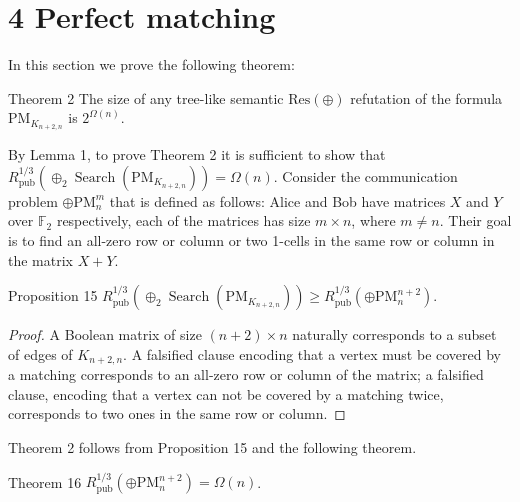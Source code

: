 \section*{4 Perfect matching}
In this section we prove the following theorem:
\begin{authorclaim}{Theorem 2}
The size of any tree-like semantic $\mathrm{Res}(\oplus)$ refutation of the formula $\mathrm{PM}_{K_{n+2,n}}$ is $2^{\Omega(n)}$.
\end{authorclaim}
By Lemma 1, to prove Theorem 2 it is sufficient to show that $R^{1/3}_{\mathrm{pub}}(\oplus_2\operatorname{Search}(\mathrm{PM}_{K_{n+2,n}}))=\Omega(n)$.
Consider the communication problem $\oplus\mathrm{PM}_n^m$ that is defined as follows: Alice and Bob have matrices $X$ and $Y$ over $\mathbb F_2$ respectively, each of the matrices has size $m\times n$, where $m\ne n$. Their goal is to find an all-zero row or column or two 1-cells in the same row or column in the matrix $X+Y$.
\begin{authorclaim}{Proposition 15}
$R^{1/3}_{\mathrm{pub}}(\oplus_2\operatorname{Search}(\mathrm{PM}_{K_{n+2,n}}))\ge R^{1/3}_{\mathrm{pub}}(\oplus\mathrm{PM}_n^{n+2})$.
\end{authorclaim}
\begin{proof}
A Boolean matrix of size $(n+2)\times n$ naturally corresponds to a subset of edges of $K_{n+2,n}$. A falsified clause encoding that a vertex must be covered by a matching corresponds to an all-zero row or column of the matrix; a falsified clause, encoding that a vertex can not be covered by a matching twice, corresponds to two ones in the same row or column.
\end{proof}
Theorem 2 follows from Proposition 15 and the following theorem.
\begin{authorclaim}{Theorem 16}
$R^{1/3}_{\mathrm{pub}}(\oplus\mathrm{PM}_n^{n+2})=\Omega(n)$.
\end{authorclaim}
